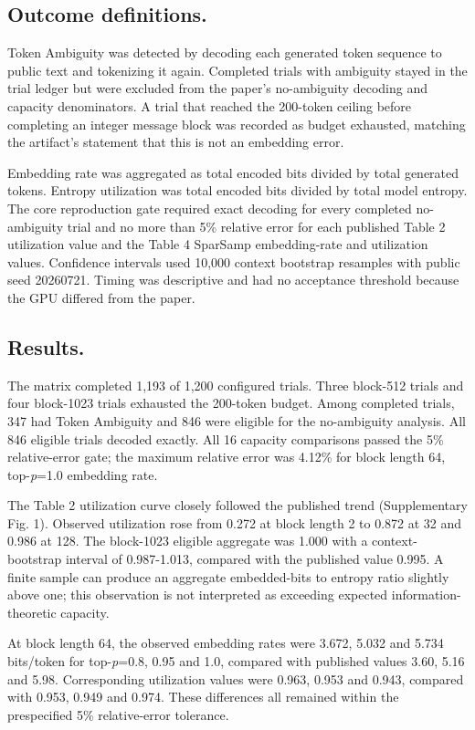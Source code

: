 \documentclass[11pt,a4paper]{article}
\begin{document}
\subsection{Outcome definitions.}
Token Ambiguity was detected by decoding each generated token sequence to public text and tokenizing it again. Completed trials with ambiguity stayed in the trial ledger but were excluded from the paper's no-ambiguity decoding and capacity denominators. A trial that reached the 200-token ceiling before completing an integer message block was recorded as budget exhausted, matching the artifact's statement that this is not an embedding error.

Embedding rate was aggregated as total encoded bits divided by total generated tokens. Entropy utilization was total encoded bits divided by total model entropy. The core reproduction gate required exact decoding for every completed no-ambiguity trial and no more than 5\% relative error for each published Table 2 utilization value and the Table 4 SparSamp embedding-rate and utilization values. Confidence intervals used 10,000 context bootstrap resamples with public seed 20260721. Timing was descriptive and had no acceptance threshold because the GPU differed from the paper.

\subsection{Results.}
The matrix completed 1,193 of 1,200 configured trials. Three block-512 trials and four block-1023 trials exhausted the 200-token budget. Among completed trials, 347 had Token Ambiguity and 846 were eligible for the no-ambiguity analysis. All 846 eligible trials decoded exactly. All 16 capacity comparisons passed the 5\% relative-error gate; the maximum relative error was 4.12\% for block length 64, top-\textit{p}=1.0 embedding rate.

The Table 2 utilization curve closely followed the published trend (Supplementary Fig. 1). Observed utilization rose from 0.272 at block length 2 to 0.872 at 32 and 0.986 at 128. The block-1023 eligible aggregate was 1.000 with a context-bootstrap interval of 0.987-1.013, compared with the published value 0.995. A finite sample can produce an aggregate embedded-bits to entropy ratio slightly above one; this observation is not interpreted as exceeding expected information-theoretic capacity.

At block length 64, the observed embedding rates were 3.672, 5.032 and 5.734 bits/token for top-\textit{p}=0.8, 0.95 and 1.0, compared with published values 3.60, 5.16 and 5.98. Corresponding utilization values were 0.963, 0.953 and 0.943, compared with 0.953, 0.949 and 0.974. These differences all remained within the prespecified 5\% relative-error tolerance.
\end{document}
